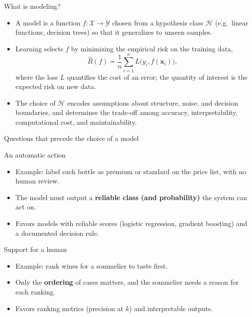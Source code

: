 \begin{frame}{What is modeling?}
\begin{itemize}
\item A model is a function $f: \mathcal{X} \to \mathcal{Y}$ chosen from a hypothesis class $\mathcal{H}$ (e.g.\ linear functions, decision trees) so that it generalizes to unseen samples.
\item Learning selects $f$ by minimizing the empirical risk on the training data,
\[
\hat{R}(f) = \frac{1}{n}\sum_{i=1}^{n} L\big(y_i, f(\mathbf{x}_i)\big),
\]
where the loss $L$ quantifies the cost of an error; the quantity of interest is the expected risk on new data.
\item The choice of $\mathcal{H}$ encodes assumptions about structure, noise, and decision boundaries, and determines the trade-off among accuracy, interpretability, computational cost, and maintainability.
\end{itemize}
\coursefooter
\end{frame}

\begin{frame}{Questions that precede the choice of a model}
\centering
{}
\coursefooter
\end{frame}

{An automatic action}
{\begin{itemize}
\item Example: label each bottle as premium or standard on the price list, with no human review.
\item The model must output a \textbf{reliable class (and probability)} the system can act on.
\item Favors models with reliable scores (logistic regression, gradient boosting) and a documented decision rule.
\end{itemize}}
{Support for a human}
{\begin{itemize}
\item Example: rank wines for a sommelier to taste first.
\item Only the \textbf{ordering} of cases matters, and the sommelier needs a reason for each ranking.
\item Favors ranking metrics (precision at $k$) and interpretable outputs.
\end{itemize}}

